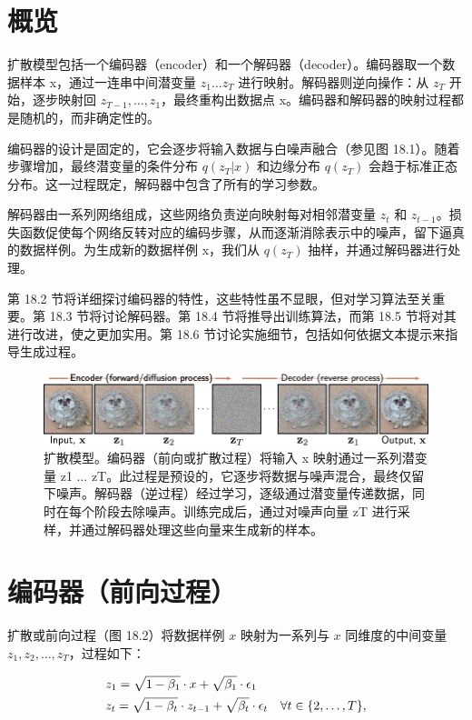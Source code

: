 \documentclass[lang=cn,newtx,10pt,scheme=chinese]{elegantbook}
\begin{document}
\section{概览}
扩散模型包括一个编码器（encoder）和一个解码器（decoder）。编码器取一个数据样本 x，通过一连串中间潜变量 \(z_1 \ldots z_T\) 进行映射。解码器则逆向操作：从 \(z_T\) 开始，逐步映射回 \(z_{T-1}, \ldots, z_1\)，最终重构出数据点 x。编码器和解码器的映射过程都是随机的，而非确定性的。

编码器的设计是固定的，它会逐步将输入数据与白噪声融合（参见图 18.1）。随着步骤增加，最终潜变量的条件分布 \(q(z_T|x)\) 和边缘分布 \(q(z_T)\) 会趋于标准正态分布。这一过程既定，解码器中包含了所有的学习参数。

解码器由一系列网络组成，这些网络负责逆向映射每对相邻潜变量 \(z_t\) 和 \(z_{t-1}\)。损失函数促使每个网络反转对应的编码步骤，从而逐渐消除表示中的噪声，留下逼真的数据样例。为生成新的数据样例 x，我们从 \(q(z_T)\) 抽样，并通过解码器进行处理。

第 18.2 节将详细探讨编码器的特性，这些特性虽不显眼，但对学习算法至关重要。第 18.3 节将讨论解码器。第 18.4 节将推导出训练算法，而第 18.5 节将对其进行改进，使之更加实用。第 18.6 节讨论实施细节，包括如何依据文本提示来指导生成过程。

\begin{figure}[ht!]
\centering
\includegraphics[width=0.7\linewidth]{PDFFigures/UDLChap18PDF/DiffusionOverview.pdf}
\caption{扩散模型。编码器（前向或扩散过程）将输入 x 映射通过一系列潜变量 z1 ... zT。此过程是预设的，它逐步将数据与噪声混合，最终仅留下噪声。解码器（逆过程）经过学习，逐级通过潜变量传递数据，同时在每个阶段去除噪声。训练完成后，通过对噪声向量 zT 进行采样，并通过解码器处理这些向量来生成新的样本。}
\end{figure}


\section{编码器（前向过程）}

扩散或前向过程（图 18.2）将数据样例 \( x \) 映射为一系列与 \( x \) 同维度的中间变量 \( z_1, z_2, \ldots, z_T \)，过程如下：

\begin{align}
&z_1 = \sqrt{1 - \beta_1} \cdot x + \sqrt{\beta_1} \cdot \epsilon_1 \notag \\
&z_t = \sqrt{1 - \beta_t} \cdot z_{t-1} + \sqrt{\beta_t} \cdot \epsilon_t \quad \forall t \in \{2, \ldots, T\}, 
\end{align} 
\end{document}
